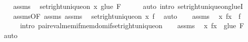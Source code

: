 \begin{isabellebody}
\ \ \isamarkupfalse%
\ assms{\isacharparenleft}{\kern0pt}{}{\isacharparenright}{\kern0pt}\ \isamarkupfalse%
\ {\isachardoublequoteopen}set{\isacharunderscore}{\kern0pt}right{\isacharunderscore}{\kern0pt}unique{\isacharunderscore}{\kern0pt}on\ {\isacharbraceleft}{\kern0pt}x{\isacharbraceright}{\kern0pt}\ {\isacharparenleft}{\kern0pt}glue\ F{\isacharparenright}{\kern0pt}{\isachardoublequoteclose}\isanewline
\ \ \ \ \isamarkupfalse%
\ {\isacharparenleft}{\kern0pt}auto\ intro{\isacharcolon}{\kern0pt}\ set{\isacharunderscore}{\kern0pt}right{\isacharunderscore}{\kern0pt}unique{\isacharunderscore}{\kern0pt}on{\isacharunderscore}{\kern0pt}glueI{\isacharparenright}{\kern0pt}\isanewline
\ \ \isamarkupfalse%
\ assms{\isacharparenleft}{\kern0pt}{}{\isacharparenright}{\kern0pt}{\isacharbrackleft}{\kern0pt}OF\ assms{\isacharparenleft}{\kern0pt}{}{\isacharparenright}{\kern0pt}\ assms{\isacharparenleft}{\kern0pt}{}{\isacharparenright}{\kern0pt}{\isacharbrackright}{\kern0pt}\ \isamarkupfalse%
\ {\isachardoublequoteopen}set{\isacharunderscore}{\kern0pt}right{\isacharunderscore}{\kern0pt}unique{\isacharunderscore}{\kern0pt}on\ {\isacharbraceleft}{\kern0pt}x{\isacharbraceright}{\kern0pt}\ f{\isachardoublequoteclose}\ \isamarkupfalse%
\ auto\isanewline
\ \ \isamarkupfalse%
\ assms{\isacharparenleft}{\kern0pt}{}{\isacharparenright}{\kern0pt}\ \isamarkupfalse%
\ {\isachardoublequoteopen}{\isasymlangle}x{\isacharcomma}{\kern0pt}\ f{\isacharbackquote}{\kern0pt}x{\isasymrangle}\ {\isasymin}\ f{\isachardoublequoteclose}\isanewline
\ \ \ \ \isamarkupfalse%
\ {\isacharparenleft}{\kern0pt}intro\ pair{\isacharunderscore}{\kern0pt}eval{\isacharunderscore}{\kern0pt}mem{\isacharunderscore}{\kern0pt}if{\isacharunderscore}{\kern0pt}mem{\isacharunderscore}{\kern0pt}dom{\isacharunderscore}{\kern0pt}if{\isacharunderscore}{\kern0pt}set{\isacharunderscore}{\kern0pt}right{\isacharunderscore}{\kern0pt}unique{\isacharunderscore}{\kern0pt}on{\isacharparenright}{\kern0pt}\isanewline
\ \ \isamarkupfalse%
\ assms{\isacharparenleft}{\kern0pt}{}{\isacharparenright}{\kern0pt}\ \isamarkupfalse%
\ {\isachardoublequoteopen}{\isasymlangle}x{\isacharcomma}{\kern0pt}\ f{\isacharbackquote}{\kern0pt}x{\isasymrangle}\ {\isasymin}\ {\isacharparenleft}{\kern0pt}glue\ F{\isacharparenright}{\kern0pt}{\isachardoublequoteclose}\ \isamarkupfalse%
\ auto\isanewline

\end{isabellebody}
